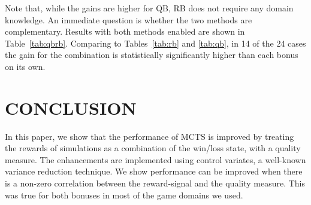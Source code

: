 \documentclass{ecai2014}
\begin{document}
\begin{table}
{\caption{Qualitative Bonus and Relative Bonus combined using different search times, 5000 games} \label{tab:qbrb}}
\tabcolsep=0.15cm
\centering
{}
\end{table}

Note that, while the gains are higher for QB, RB does not require any domain knowledge. An immediate question is whether the two methods are complementary. Results with both methods enabled are shown in Table~\ref{tab:qbrb}. Comparing to Tables~\ref{tab:rb} and \ref{tab:qb}, in 14 of the 24 cases the gain for the combination is statistically significantly higher than each bonus on its own.

\section{CONCLUSION}
\label{sec:concl}
In this paper, we show that the performance of MCTS is improved by treating the rewards of simulations as a combination of the win/loss state, with a quality measure. The enhancements are implemented using control variates, a well-known variance reduction technique. We show performance can be improved when there is a non-zero correlation between the reward-signal and the quality measure. This was true for both bonuses in most of the game domains we used. 
\end{document}
